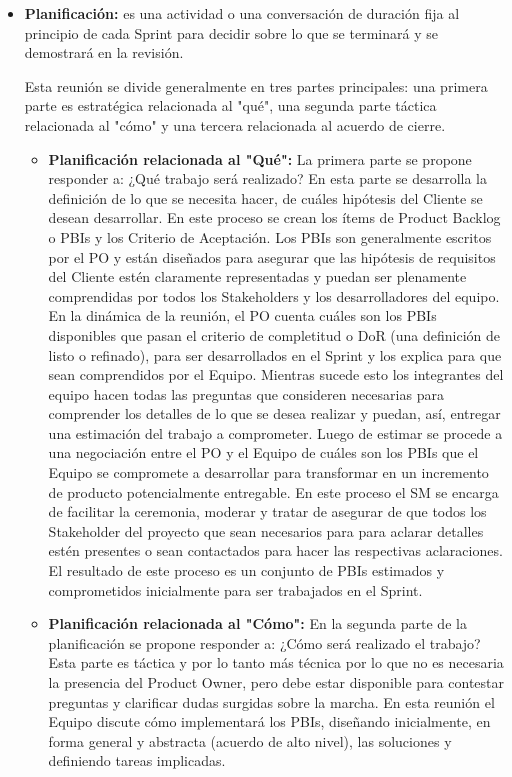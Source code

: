 \begin{itemize}

\item \textbf{Planificación:} es una actividad o una conversación de duración fija al principio de cada Sprint para decidir sobre lo que se terminará y se demostrará en la revisión.

Esta reunión se divide generalmente en tres partes principales: una primera parte es estratégica relacionada al "qué", una segunda parte táctica relacionada al "cómo" y una tercera relacionada al acuerdo de cierre. 

\begin{itemize}

\item \textbf{Planificación relacionada al "Qué":} La primera parte se propone responder a: ¿Qué trabajo será realizado? En esta parte se desarrolla la definición de lo que se necesita hacer, de cuáles hipótesis del Cliente se desean desarrollar. En este proceso se crean los ítems de Product Backlog o PBIs y los Criterio de Aceptación. Los PBIs son generalmente escritos por el PO y están diseñados para asegurar que las hipótesis de requisitos del Cliente estén claramente representadas y puedan ser plenamente comprendidas por todos los Stakeholders y los desarrolladores del equipo.
En la dinámica de la reunión, el PO cuenta cuáles son los PBIs disponibles que pasan el criterio de completitud o DoR (una definición de listo o refinado), para ser desarrollados en el Sprint y los explica para que sean comprendidos por el Equipo. Mientras sucede esto los integrantes del equipo hacen todas las preguntas que consideren necesarias para comprender los detalles de lo que se desea realizar y puedan, así, entregar una estimación del trabajo a comprometer. Luego de estimar se procede a una negociación entre el PO y el Equipo de cuáles son los PBIs que el Equipo se compromete a desarrollar para transformar en un incremento de producto potencialmente entregable. En este proceso el SM se encarga de facilitar la ceremonia, moderar y tratar de asegurar de que todos los Stakeholder del proyecto que sean necesarios para para aclarar detalles estén presentes o sean contactados para hacer las respectivas aclaraciones.
El resultado de este proceso es un conjunto de PBIs estimados y comprometidos inicialmente para ser trabajados en el Sprint.

\item \textbf{Planificación relacionada al "Cómo":} En la segunda parte de la planificación se propone responder a: ¿Cómo será realizado el trabajo? Esta parte es táctica y por lo tanto más técnica por lo que no es necesaria la presencia del Product Owner, pero debe estar disponible para contestar preguntas y clarificar dudas surgidas sobre la marcha. En esta reunión el Equipo discute cómo implementará los PBIs, diseñando inicialmente, en forma general y abstracta (acuerdo de alto nivel), las soluciones y definiendo tareas implicadas. 


\end{itemize}
\end{itemize}
